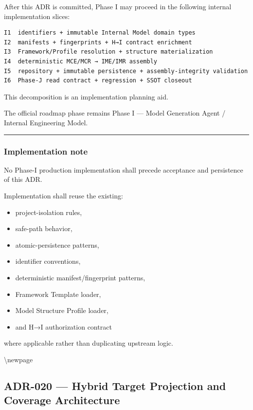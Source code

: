 After this ADR is committed, Phase I may proceed in the following internal implementation slices:

\begin{verbatim}
I1  identifiers + immutable Internal Model domain types
I2  manifests + fingerprints + H→I contract enrichment
I3  Framework/Profile resolution + structure materialization
I4  deterministic MCE/MCR → IME/IMR assembly
I5  repository + immutable persistence + assembly-integrity validation
I6  Phase-J read contract + regression + SSOT closeout
\end{verbatim}

This decomposition is an implementation planning aid.

The official roadmap phase remains Phase I --- Model Generation Agent / Internal Engineering Model.

\begin{center}\rule{0.5\linewidth}{0.5pt}\end{center}

\hypertarget{implementation-note-1}{%
\subsubsection{Implementation note}\label{implementation-note-1}}

No Phase-I production implementation shall precede acceptance and persistence of this ADR.

Implementation shall reuse the existing:

\begin{itemize}
\tightlist
\item
  project-isolation rules,
\item
  safe-path behavior,
\item
  atomic-persistence patterns,
\item
  identifier conventions,
\item
  deterministic manifest/fingerprint patterns,
\item
  Framework Template loader,
\item
  Model Structure Profile loader,
\item
  and H→I authorization contract
\end{itemize}

where applicable rather than duplicating upstream logic.

\textbackslash newpage

\hypertarget{adr-020--hybrid-target-projection-and-coverage-architecture}{%
\subsection{ADR-020 --- Hybrid Target Projection and Coverage Architecture}\label{adr-020--hybrid-target-projection-and-coverage-architecture}}

